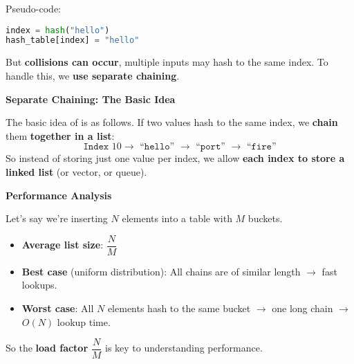 \highspace
Pseudo-code:
\begin{lstlisting}[language=python]
index = hash("hello")
hash_table[index] = "hello"
\end{lstlisting}
But \textbf{collisions can occur}, multiple inputs may hash to the same index. To handle this, we \textbf{use separate chaining}.

\highspace
\begin{flushleft}
    \textcolor{Green3}{ \textbf{Separate Chaining: The Basic Idea}}
\end{flushleft}
The basic idea of  is as follows. If two values hash to the same index, we \textbf{chain} them \textbf{together in a list}:
\begin{equation*}
    \texttt{Index }10 \rightarrow \texttt{ ``hello'' } \rightarrow \texttt{ ``port'' } \rightarrow \texttt{ ``fire''}
\end{equation*}
So instead of storing just one value per index, we allow \textbf{each index to store a linked list} (or vector, or queue).

\highspace
\begin{flushleft}
    \textcolor{Green3}{\faIcon{\speedIcon} \textbf{Performance Analysis}}
\end{flushleft}
Let's say we're inserting $N$ elements into a table with $M$ buckets.
\begin{itemize}
    \item \textbf{Average list size}: $\dfrac{N}{M}$
    \item \textcolor{Green3}{\textbf{Best case}} (uniform distribution): All chains are of similar length $\rightarrow$ fast lookups.
    \item \textcolor{Red2}{\textbf{Worst case}}: All $N$ elements hash to the same bucket $\rightarrow$ one long chain $\rightarrow$ $O\left(N\right)$ lookup time.
\end{itemize}
So the \textbf{load factor} $\dfrac{N}{M}$ is key to understanding performance.


